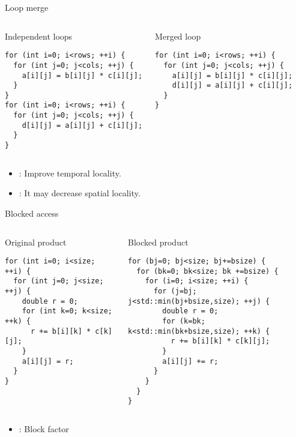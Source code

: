 \begin{frame}[t,fragile]{Loop merge}
\begin{columns}[T]

\begin{block}{Independent loops}
\begin{lstlisting}
for (int i=0; i<rows; ++i) {
  for (int j=0; j<cols; ++j) {
    a[i][j] = b[i][j] * c[i][j];
  }
}
for (int i=0; i<rows; ++i) {
  for (int j=0; j<cols; ++j) {
    d[i][j] = a[i][j] + c[i][j];
  }
}
\end{lstlisting}
\end{block}

\pause
{}
\begin{block}{Merged loop}
\begin{lstlisting}
for (int i=0; i<rows; ++i) {
  for (int j=0; j<cols; ++j) {
    a[i][j] = b[i][j] * c[i][j];
    d[i][j] = a[i][j] + c[i][j];
  }
}
\end{lstlisting}
\end{block}
\end{columns}

\begin{itemize}
  \item {}: Improve temporal locality.
  \item {}: It may decrease spatial locality.
\end{itemize}

\end{frame}

\begin{frame}[t,fragile]{Blocked access}
\begin{columns}[T]

\begin{block}{Original product}
\begin{lstlisting}
for (int i=0; i<size; ++i) {
  for (int j=0; j<size; ++j) {
    double r = 0;
    for (int k=0; k<size; ++k) {
      r += b[i][k] * c[k][j];
    }
    a[i][j] = r;
  }
}
\end{lstlisting}
\end{block}

\pause
{}
\begin{block}{Blocked product}
\begin{lstlisting}
for (bj=0; bj<size; bj+=bsize) {
  for (bk=0; bk<size; bk +=bsize) {
    for (i=0; i<size; ++i) {
      for (j=bj; j<std::min(bj+bsize,size); ++j) {
        double r = 0;
        for (k=bk; k<std::min(bk+bsize,size); ++k) {
          r += b[i][k] * c[k][j];
        }
        a[i][j] += r;
      }
    }
  }
}
\end{lstlisting}
\end{block}
\end{columns}

\begin{itemize}
  \item {}: Block factor
\end{itemize}

\end{frame}
